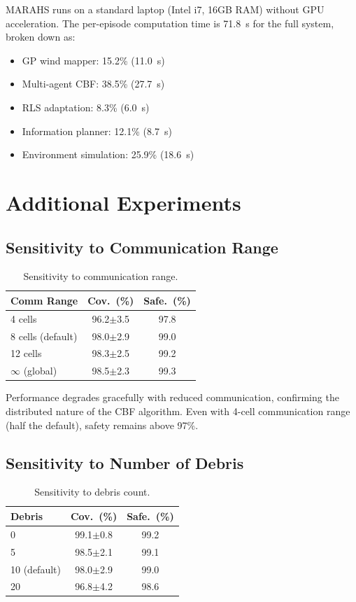 \documentclass[12pt,a4paper,twocolumn]{article}
\begin{document}
\begin{enumerate}[leftmargin=*]
MARAHS runs on a standard laptop (Intel i7, 16GB RAM) without GPU acceleration. The per-episode computation time is 71.8~s for the full system, broken down as:
\begin{itemize}[leftmargin=*]
    \item GP wind mapper: 15.2\% (11.0~s)
    \item Multi-agent CBF: 38.5\% (27.7~s)
    \item RLS adaptation: 8.3\% (6.0~s)
    \item Information planner: 12.1\% (8.7~s)
    \item Environment simulation: 25.9\% (18.6~s)
\end{itemize}

\section{Additional Experiments}
\label{app:additional}

\subsection{Sensitivity to Communication Range}

\begin{table}[htbp]
\centering
\caption{Sensitivity to communication range.}
\label{tab:comm_sensitivity}
\small
\begin{tabular}{lcc}
\toprule
\textbf{Comm Range} & \textbf{Cov.\ (\%)} & \textbf{Safe.\ (\%)} \\
\midrule
4 cells & 96.2$\pm$3.5 & 97.8 \\
8 cells (default) & 98.0$\pm$2.9 & 99.0 \\
12 cells & 98.3$\pm$2.5 & 99.2 \\
$\infty$ (global) & 98.5$\pm$2.3 & 99.3 \\
\bottomrule
\end{tabular}
\end{table}

Performance degrades gracefully with reduced communication, confirming the distributed nature of the CBF algorithm. Even with 4-cell communication range (half the default), safety remains above 97\%.

\subsection{Sensitivity to Number of Debris}

\begin{table}[htbp]
\centering
\caption{Sensitivity to debris count.}
\label{tab:debris_sensitivity}
\small
\begin{tabular}{lcc}
\toprule
\textbf{Debris} & \textbf{Cov.\ (\%)} & \textbf{Safe.\ (\%)} \\
\midrule
0 & 99.1$\pm$0.8 & 99.2 \\
5 & 98.5$\pm$2.1 & 99.1 \\
10 (default) & 98.0$\pm$2.9 & 99.0 \\
20 & 96.8$\pm$4.2 & 98.6 \\
\bottomrule
\end{tabular}
\end{table}


\end{enumerate}
\end{document}
